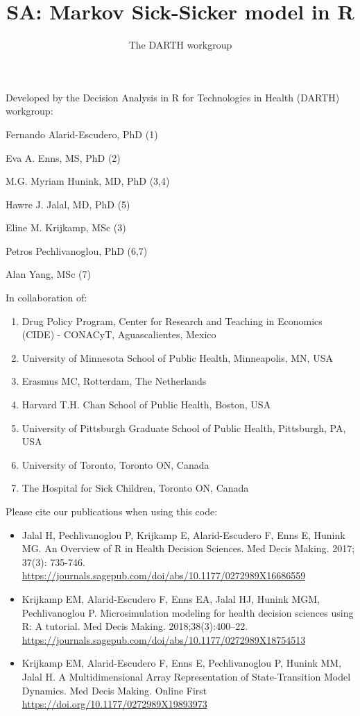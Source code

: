 \documentclass[
]{article}
\title{SA: Markov Sick-Sicker model in R}
\author{The DARTH workgroup}
\date{}
\providecommand{\tightlist}{%
  \setlength{\itemsep}{0pt}\setlength{\parskip}{0pt}}
\begin{document}
\maketitle

Developed by the Decision Analysis in R for Technologies in Health
(DARTH) workgroup:

Fernando Alarid-Escudero, PhD (1)

Eva A. Enns, MS, PhD (2)

M.G. Myriam Hunink, MD, PhD (3,4)

Hawre J. Jalal, MD, PhD (5)

Eline M. Krijkamp, MSc (3)

Petros Pechlivanoglou, PhD (6,7)

Alan Yang, MSc (7)

In collaboration of:

\begin{enumerate}
\def\labelenumi{\arabic{enumi}.}
\tightlist
\item
  Drug Policy Program, Center for Research and Teaching in Economics
  (CIDE) - CONACyT, Aguascalientes, Mexico
\item
  University of Minnesota School of Public Health, Minneapolis, MN, USA
\item
  Erasmus MC, Rotterdam, The Netherlands
\item
  Harvard T.H. Chan School of Public Health, Boston, USA
\item
  University of Pittsburgh Graduate School of Public Health, Pittsburgh,
  PA, USA
\item
  University of Toronto, Toronto ON, Canada
\item
  The Hospital for Sick Children, Toronto ON, Canada
\end{enumerate}

Please cite our publications when using this code:

\begin{itemize}
\item
  Jalal H, Pechlivanoglou P, Krijkamp E, Alarid-Escudero F, Enns E,
  Hunink MG. An Overview of R in Health Decision Sciences. Med Decis
  Making. 2017; 37(3): 735-746.
  \url{https://journals.sagepub.com/doi/abs/10.1177/0272989X16686559}
\item
  Krijkamp EM, Alarid-Escudero F, Enns EA, Jalal HJ, Hunink MGM,
  Pechlivanoglou P. Microsimulation modeling for health decision
  sciences using R: A tutorial. Med Decis Making. 2018;38(3):400--22.
  \url{https://journals.sagepub.com/doi/abs/10.1177/0272989X18754513}
\item
  Krijkamp EM, Alarid-Escudero F, Enns E, Pechlivanoglou P, Hunink MM,
  Jalal H. A Multidimensional Array Representation of State-Transition
  Model Dynamics. Med Decis Making. Online First
  \url{https://doi.org/10.1177/0272989X19893973}
\end{itemize}
\end{document}
